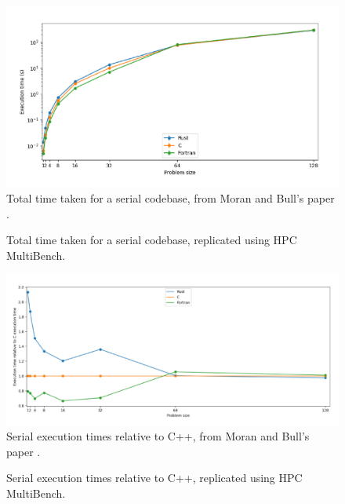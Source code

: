 \newpage
\begin{figure}[H]
    \centering
    \includegraphics[width=\textwidth]{images/4_tooling/replication_study/replication_original_1.png}
    \caption{Total time taken for a serial codebase, from Moran and Bull's paper \cite{moranEmergingTechnologiesRust2023}.}
    \label{fig:replication_original_1}
\end{figure}
\begin{figure}[H]
    \centering
    
    \vspace*{-0.5cm}
    \caption{Total time taken for a serial codebase, replicated using HPC MultiBench.}
    \label{fig:replication_mine_1}
\end{figure}


\begin{figure}[H]
    \centering
    \includegraphics[width=\textwidth]{images/4_tooling/replication_study/replication_original_2.png}
    \caption{Serial execution times relative to C++, from Moran and Bull's paper \cite{moranEmergingTechnologiesRust2023}.}
    \label{fig:replication_original_2}
\end{figure}
\begin{figure}[H]
    \centering
    
    \vspace*{-0.5cm}
    \caption{Serial execution times relative to C++, replicated using HPC MultiBench.}
    \label{fig:replication_mine_2}
\end{figure}


